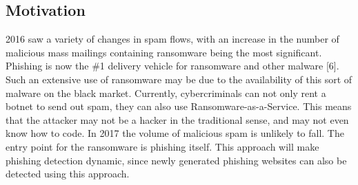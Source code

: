 \documentclass[12pt]{article}
\begin{document}

\pagestyle{fancy}
\fancyhf{}
\renewcommand{\headrulewidth}{0pt}
\cfoot{\thepage}

\subsection{Motivation}
2016 saw a variety of changes in spam flows, with an increase in the number of malicious mass mailings containing ransomware being the most significant. Phishing is now the \#1 delivery vehicle for ransomware and other malware [6]. Such an extensive use of ransomware may be due to the availability of this sort of malware on the black market. Currently, cybercriminals can not only rent a botnet to send out spam, they can also use Ransomware-as-a-Service. This means that the attacker may not be a hacker in the traditional sense, and may not even know how to code. In 2017 the volume of malicious spam is unlikely to fall. The entry point for the ransomware is phishing itself. This approach will make phishing detection dynamic, since newly generated phishing websites can also be detected using this approach. 
\end{document}
